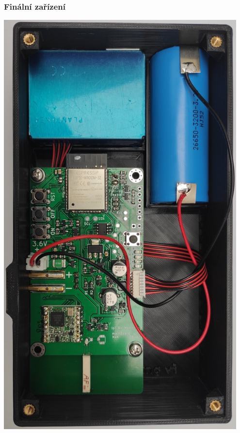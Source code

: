 \documentclass[%
  12pt,       				%
	t,                  %
	aspectratio=1610,   %
	unicode,						%
]{beamer}				    	%
\begin{document}

\begin{frame}
	\frametitle{Finální zařízení}
	\centering
	\includegraphics[angle=90,origin=c,width=0.95\textwidth]{obrazky/finalDevice.jpg}	

\end{frame}

\end{document}
